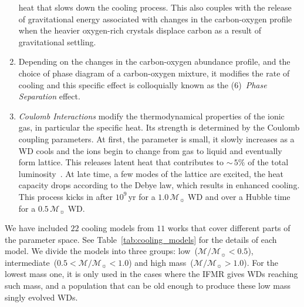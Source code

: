 \documentclass[fleqn,usenatbib]{rasti}
\newcommand{\msun}{\mathcal{M}_{\sun}}
\begin{document}
\begin{enumerate}
heat that slows down the cooling process. This also couples with the release
of gravitational energy associated with changes in the carbon-oxygen
profile~\citep{1997ApJ...486..413S} when the heavier oxygen-rich crystals
displace carbon as a result of gravitational settling.
    \item Depending on the
changes in the carbon-oxygen abundance profile, and the choice of phase
diagram of a carbon-oxygen mixture, it modifies the rate of cooling and this
specific effect is colloquially known as the (6)~\textit{Phase Separation}
effect.
    \item \textit{Coulomb Interactions} modify the thermodynamical
properties of the ionic gas, in particular the specific heat. Its strength is
determined by the Coulomb coupling parameters. At first, the parameter is
small, it slowly increases as a WD cools and the ions begin to change from
gas to liquid and eventually form lattice. This releases latent heat that
contributes to $\sim$\,$5\%$ of the total luminosity~\citep{1976A&A....51..383S}.
At late time, a few modes of the lattice are excited, the heat capacity drops
according to the Debye law, which results in enhanced cooling. This process
kicks in after $10^9$\,yr for a $1.0\,\msun$ WD and over a Hubble time for a
$0.5\,\msun$ WD.
\end{enumerate}

We have included $22$ cooling
models from $11$ works that cover different parts of the parameter space. See
Table~\ref{tab:cooling_models} for the details of each model.  We divide the 
models into three groups: low~($\mathcal{M}/\msun < 0.5$),
intermediate~($0.5 < \mathcal{M}/\msun < 1.0$) and
high mass~($\mathcal{M}/\msun > 1.0$). For the lowest mass one, it is only
used in the cases where the IFMR gives WDs reaching such mass, and a
population that can be old enough to produce these low mass singly evolved
WDs.
\end{document}
